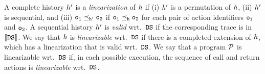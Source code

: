 %
A complete history $h'$ 
is a {\it linearization} of $h$ if
(i) $h'$ is a permutation of $h$,
(ii) $h'$ is sequential, 
and
(iii) $\tt o_1\preceq_{h'}\tt o_2$
if $\tt o_1\preceq_{h}\tt o_2$
for each pair of action identifiers $\tt o_1$ and $\tt o_2$.
%
A sequential history $h'$ is {\it valid} wrt.\ ${\tt DS}$ if
the corresponding trace is in $\left\llbracket{{\tt DS}}\right\rrbracket$.
%
We say that $h$ is {\it linearizable} wrt.\ ${\tt DS}$ if there is
a completed extension of $h$, which has
a linearization that is valid wrt.\ ${\tt DS}$.
%
We say that a program ${\mathcal P}$ is linearizable wrt.\ 
${\tt DS}$ if, in each possible execution, the sequence
of call and return actions is {\em linearizable} wrt.\ ${\tt DS}$.
















